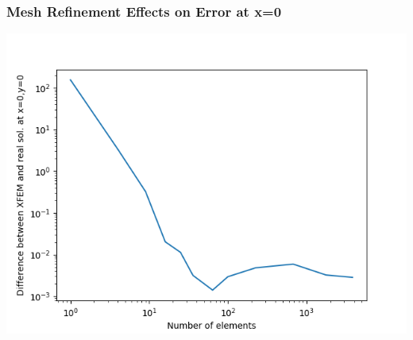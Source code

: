 \documentclass[]{beamer}
\begin{document}
\begin{frame}[t]\frametitle{Mesh Refinement Effects on Error at x=0}
	\begin{center}
		\includegraphics[scale=0.5]{figures/2D_xy_ls1mat_neumann_comp}
	\end{center}
\end{frame}
\end{document}
